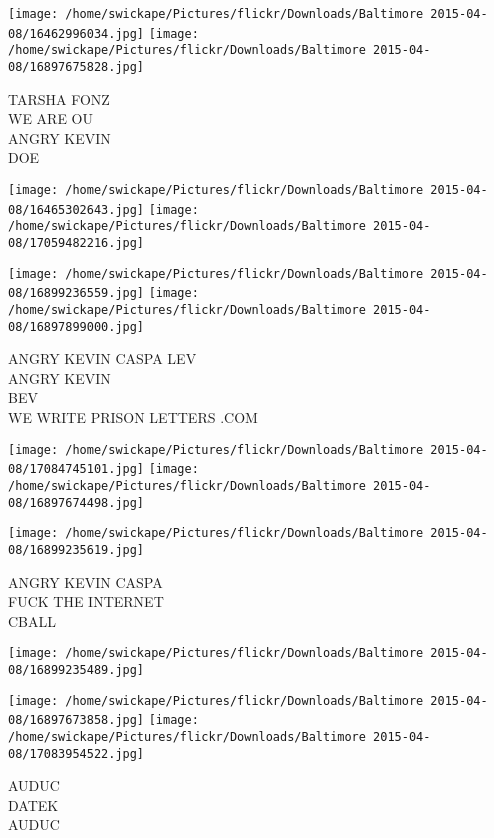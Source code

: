 \documentclass[10pt,letterpaper]{article}
\begin{document}
\texttt{[image: /home/swickape/Pictures/flickr/Downloads/Baltimore 2015-04-08/16462996034.jpg]}
\texttt{[image: /home/swickape/Pictures/flickr/Downloads/Baltimore 2015-04-08/16897675828.jpg]}

TARSHA FONZ\\
WE ARE OU\\
ANGRY KEVIN\\
DOE\\
\pagebreak

\texttt{[image: /home/swickape/Pictures/flickr/Downloads/Baltimore 2015-04-08/16465302643.jpg]}
\texttt{[image: /home/swickape/Pictures/flickr/Downloads/Baltimore 2015-04-08/17059482216.jpg]}

\texttt{[image: /home/swickape/Pictures/flickr/Downloads/Baltimore 2015-04-08/16899236559.jpg]}
\texttt{[image: /home/swickape/Pictures/flickr/Downloads/Baltimore 2015-04-08/16897899000.jpg]}

ANGRY KEVIN CASPA LEV\\
ANGRY KEVIN\\
BEV\\
WE WRITE PRISON LETTERS .COM\\
\pagebreak

\texttt{[image: /home/swickape/Pictures/flickr/Downloads/Baltimore 2015-04-08/17084745101.jpg]}
\texttt{[image: /home/swickape/Pictures/flickr/Downloads/Baltimore 2015-04-08/16897674498.jpg]}

\texttt{[image: /home/swickape/Pictures/flickr/Downloads/Baltimore 2015-04-08/16899235619.jpg]}

ANGRY KEVIN CASPA\\
FUCK THE INTERNET\\
CBALL\\
\pagebreak

\texttt{[image: /home/swickape/Pictures/flickr/Downloads/Baltimore 2015-04-08/16899235489.jpg]}

\vspace{0.25in}
\texttt{[image: /home/swickape/Pictures/flickr/Downloads/Baltimore 2015-04-08/16897673858.jpg]}
\texttt{[image: /home/swickape/Pictures/flickr/Downloads/Baltimore 2015-04-08/17083954522.jpg]}

AUDUC\\
DATEK\\
AUDUC\\
\pagebreak
\end{document}
